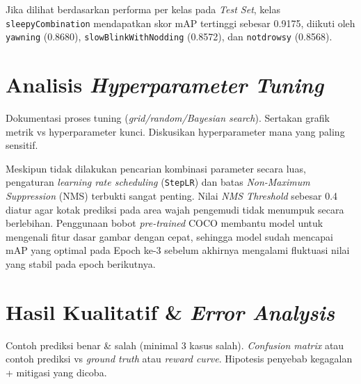 \documentclass[11pt,a4paper,oneside]{report}
\begin{document}
Jika dilihat berdasarkan performa per kelas pada \textit{Test Set}, kelas \texttt{sleepyCombination} mendapatkan skor mAP tertinggi sebesar 0.9175, diikuti oleh \texttt{yawning} (0.8680), \texttt{slowBlinkWithNodding} (0.8572), dan \texttt{notdrowsy} (0.8568).

\section{Analisis \textit{Hyperparameter Tuning}}
\begin{petunjuk}
Dokumentasi proses tuning (\textit{grid/random/Bayesian search}). Sertakan grafik metrik vs hyperparameter kunci. Diskusikan hyperparameter mana yang paling sensitif.
\end{petunjuk}

Meskipun tidak dilakukan pencarian kombinasi parameter secara luas, pengaturan \textit{learning rate scheduling} (\texttt{StepLR}) dan batas \textit{Non-Maximum Suppression} (NMS) terbukti sangat penting. Nilai \textit{NMS Threshold} sebesar 0.4 diatur agar kotak prediksi pada area wajah pengemudi tidak menumpuk secara berlebihan. Penggunaan bobot \textit{pre-trained} COCO membantu model untuk mengenali fitur dasar gambar dengan cepat, sehingga model sudah mencapai mAP yang optimal pada Epoch ke-3 sebelum akhirnya mengalami fluktuasi nilai yang stabil pada epoch berikutnya.

\section{Hasil Kualitatif \& \textit{Error Analysis}}
\begin{petunjuk}
Contoh prediksi benar \& salah (minimal 3 kasus salah). \textit{Confusion matrix} atau contoh prediksi vs \textit{ground truth} atau \textit{reward curve}. Hipotesis penyebab kegagalan + mitigasi yang dicoba.
\end{petunjuk}
\end{document}

